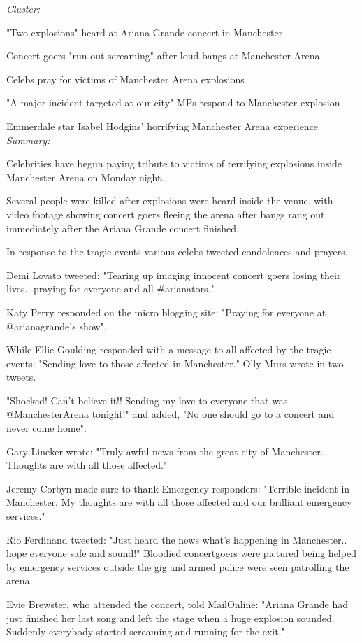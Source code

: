\documentclass[12pt]{article}
\begin{document}
\begin{mdframed}

\emph{Cluster:}

"Two explosions" heard at Ariana Grande concert in Manchester \cite{ag1}

Concert goers "run out screaming" after loud bangs at Manchester Arena \cite{ag2}

Celebs pray for victims of Manchester Arena explosions \cite{ag3}

"A major incident targeted at our city" MPs respond to Manchester explosion \cite{ag4}

Emmerdale star Isabel Hodgins' horrifying Manchester Arena experience \cite{ag5} \\

\emph{Summary:}

Celebrities have begun paying tribute to victims of terrifying explosions inside Manchester Arena on Monday night.

Several people were killed after explosions were heard inside the venue, with video footage showing concert goers fleeing the arena after bangs rang out immediately after the Ariana Grande concert finished.

In response to the tragic events various celebs tweeted condolences and prayers.

Demi Lovato tweeted: "Tearing up imaging innocent concert goers losing their lives.. praying for everyone and all \#arianators."

Katy Perry responded on the micro blogging site: "Praying for everyone at @arianagrande's show".

While Ellie Goulding responded with a message to all affected by the tragic events: "Sending love to those affected in Manchester." Olly Murs wrote in two tweets.

"Shocked! Can't believe it!! Sending my love to everyone that was @ManchesterArena tonight!" and added, "No one should go to a concert and never come home".

Gary Lineker wrote: "Truly awful news from the great city of Manchester. Thoughts are with all those affected."

Jeremy Corbyn made sure to thank Emergency responders: "Terrible incident in Manchester. My thoughts are with all those affected and our brilliant emergency services."

Rio Ferdinand tweeted: "Just heard the news what's happening in Manchester.. hope everyone safe and sound!" Bloodied concertgoers were pictured being helped by emergency services outside the gig and armed police were seen patrolling the arena.

Evie Brewster, who attended the concert, told MailOnline: "Ariana Grande had just finished her last song and left the stage when a huge explosion sounded. Suddenly everybody started screaming and running for the exit." \\

\end{mdframed}
\end{document}
